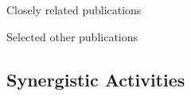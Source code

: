 

\noindent Closely related publications


\noindent
\noindent Selected other publications

\subsection*{Synergistic Activities}




